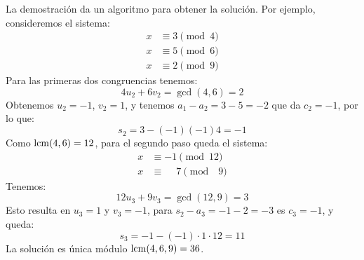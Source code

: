   La demostración da un algoritmo para obtener la solución.
  Por ejemplo,
  consideremos el sistema:
  \begin{align*}
    x &\equiv 3 \pmod{4} \\
    x &\equiv 5 \pmod{6} \\
    x &\equiv 2 \pmod{9}
  \end{align*}
  Para las primeras dos congruencias tenemos:
  \begin{equation*}
    4 u_2 + 6 v_2
      = \gcd(4, 6)
      = 2
  \end{equation*}
  Obtenemos \(u_2 = -1\), \(v_2 = 1\),
  y tenemos \(a_1 - a_2 = 3 - 5 = -2\) que da \(c_2 = -1\),
  por lo que:
  \begin{equation*}
    s_2
      = 3 - (-1) (-1) 4
      = -1
  \end{equation*}
  Como \(\operatorname{lcm}(4, 6) = 12\),
  para el segundo paso queda el sistema:
  \begin{align*}
    x &\equiv -1	    \pmod{12} \\
    x &\equiv \phantom{-}7  \pmod{\phantom{0}9}
  \end{align*}
  Tenemos:
  \begin{equation*}
    12 u_3 + 9 v_3
      = \gcd(12, 9)
      = 3
  \end{equation*}
  Esto resulta en \(u_3 = 1\) y \(v_3 = -1\),
  para \(s_2 - a_3 = -1 - 2 = -3\) es \(c_3 = -1\),
  y queda:
  \begin{equation*}
    s_3
      = -1 - (-1) \cdot 1 \cdot 12
      = 11
  \end{equation*}
  La solución es única módulo \(\operatorname{lcm}(4, 6, 9) = 36\).

